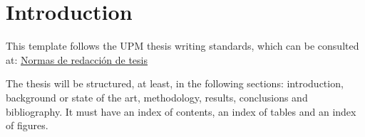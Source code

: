 \chapter{Introduction}
\label{sect::Introduction}



 
This template follows the UPM thesis writing standards, which can be consulted at: \href{https://www.upm.es/Estudiantes/Estudios_Titulaciones/Estudios_Doctorado/Tesis/NormasRedaccionTesis}{Normas de redacción de tesis}


The thesis will be structured, at least, in the following sections: introduction, background or state of the art, methodology, results, conclusions and bibliography. It must have an index of contents, an index of tables and an index of figures.
